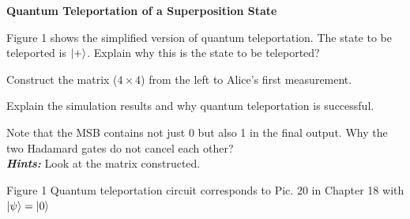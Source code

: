 \documentclass[a4paper, 10pt]{article}
\begin{document}
\begin{problem}
\textbf{Quantum Teleportation of a Superposition State}
\begin{subproblems_alpha}
	\item Figure 1 shows the simplified version of quantum teleportation.
	      The state to be teleported is \( \ket{+} \). Explain why this is the state to be teleported?
	\item Construct the matrix (\( 4 \times 4 \)) from the left to Alice's first measurement.
	\item Explain the simulation results and why quantum teleportation is successful.
	\item Note that the MSB contains not just 0 but also 1 in the final output.
	      Why the two Hadamard gates do not cancel each other? \\
	      \textbf{\textit{Hints:}} Look at the matrix constructed.
\end{subproblems_alpha}


\begin{center}
	{\footnotesize Figure 1 Quantum teleportation circuit corresponds to Pic. 20 in Chapter 18 with \( \ket{\psi} = \ket{0} \)}
\end{center}
\end{problem}
\end{document}

